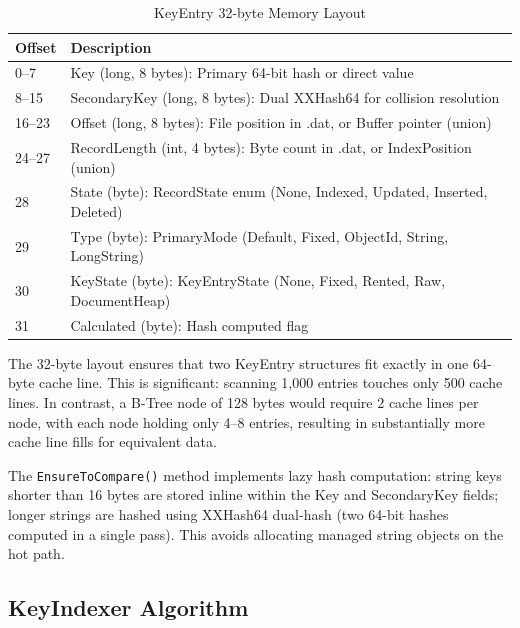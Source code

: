 \documentclass[conference]{IEEEtran}
\begin{document}
\begin{table}[htbp]
    \caption{KeyEntry 32-byte Memory Layout}
    \label{tab:keyentry_layout}
    \centering
    \begin{tabularx}{\linewidth}{l>{\raggedright\arraybackslash}X}
        \toprule
        \textbf{Offset} & \textbf{Description} \\
        \midrule
        0--7 & Key (long, 8 bytes): Primary 64-bit hash or direct value \\
        8--15 & SecondaryKey (long, 8 bytes): Dual XXHash64 for collision resolution \\
        16--23 & Offset (long, 8 bytes): File position in .dat, or Buffer pointer (union) \\
        24--27 & RecordLength (int, 4 bytes): Byte count in .dat, or IndexPosition (union) \\
        28 & State (byte): RecordState enum (None, Indexed, Updated, Inserted, Deleted) \\
        29 & Type (byte): PrimaryMode (Default, Fixed, ObjectId, String, LongString) \\
        30 & KeyState (byte): KeyEntryState (None, Fixed, Rented, Raw, DocumentHeap) \\
        31 & Calculated (byte): Hash computed flag \\
        \bottomrule
    \end{tabularx}
\end{table}

The 32-byte layout ensures that two KeyEntry structures fit exactly in one 64-byte cache line. This is significant: scanning 1,000 entries touches only 500 cache lines. In contrast, a B-Tree node of 128 bytes would require 2 cache lines per node, with each node holding only 4--8 entries, resulting in substantially more cache line fills for equivalent data.

The \texttt{EnsureToCompare()} method implements lazy hash computation: string keys shorter than 16 bytes are stored inline within the Key and SecondaryKey fields; longer strings are hashed using XXHash64 dual-hash (two 64-bit hashes computed in a single pass). This avoids allocating managed string objects on the hot path.

\subsection{KeyIndexer Algorithm}
\label{sec:keyindexer_algorithm}
\end{document}
